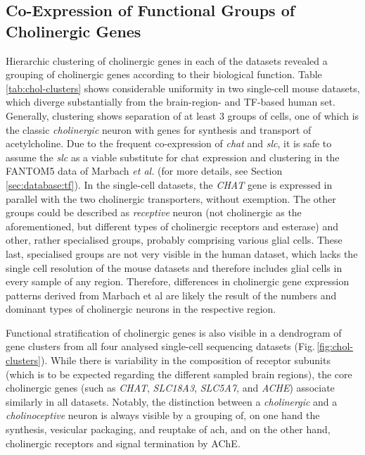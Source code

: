 \subsection{Co-Expression of Functional Groups of Cholinergic Genes}
Hierarchic clustering of cholinergic genes in each of the datasets revealed a grouping of cholinergic genes according to their biological function. Table \ref{tab:chol-clusters} shows considerable uniformity in two single-cell mouse datasets, which diverge substantially from the brain-region- and TF-based human set. Generally, clustering shows separation of at least 3 groups of cells, one of which is the classic \emph{cholinergic} neuron with genes for synthesis and transport of acetylcholine. Due to the frequent co-expression of \emph{\ac{chat}} and \emph{\ac{slc}}, it is safe to assume the \emph{\ac{slc}} as a viable substitute for chat expression and clustering in the FANTOM5 data of Marbach \emph{et al.}\cite{Marbach2016} (for more details, see Section \ref{sec:database:tf}). In the single-cell datasets, the \emph{CHAT} gene is expressed in parallel with the two cholinergic transporters, without exemption. The other groups could be described as \emph{receptive} neuron (not cholinergic as the aforementioned, but different types of cholinergic receptors and esterase) and other, rather specialised groups, probably comprising various glial cells. These last, specialised groups are not very visible in the human dataset, which lacks the single cell resolution of the mouse datasets and therefore includes glial cells in every sample of any region. Therefore, differences in cholinergic gene expression patterns derived from Marbach et al are likely the result of the numbers and dominant types of cholinergic neurons in the respective region.

Functional stratification of cholinergic genes is also visible in a dendrogram of gene clusters from all four analysed single-cell sequencing datasets (Fig.\,\ref{fig:chol-clusters}). While there is variability in the composition of receptor subunits (which is to be expected regarding the different sampled brain regions), the core cholinergic genes (such as \emph{CHAT}, \emph{SLC18A3}, \emph{SLC5A7}, and \emph{ACHE}) associate similarly in all datasets. Notably, the distinction between a \emph{cholinergic} and a \emph{cholinoceptive} neuron is always visible by a grouping of, on one hand the synthesis, vesicular packaging, and reuptake of \ac{ach}, and on the other hand, cholinergic receptors and signal termination by AChE.

